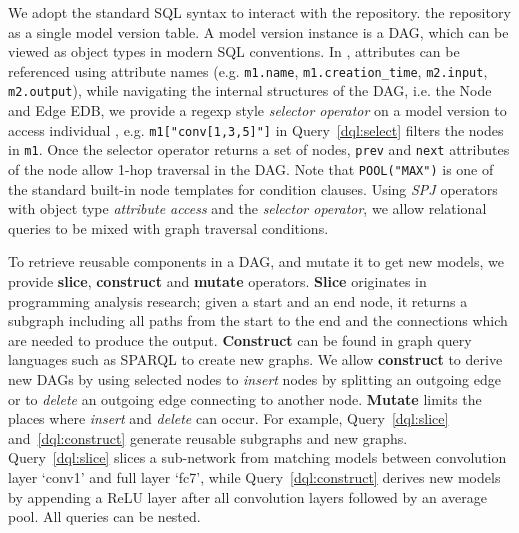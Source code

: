 \documentclass[conference]{IEEEtran}
\begin{document}
We adopt the standard SQL syntax to interact with the repository. \DQL\views
the repository as a single model version table. A model
version instance is a DAG, which can be viewed as object types in modern SQL conventions. In \DQL,
         attributes can be referenced using attribute names (e.g. \verb|m1.name|,
                \verb|m1.creation_time|, \verb|m2.input|, \verb|m2.output|), while navigating the
        internal structures of the DAG, i.e. the Node and Edge EDB, we provide a regexp style
        \emph{selector operator} on a model version to access individual \dnn\nodes{}, e.g. 
        \verb|m1["conv[1,3,5]"]| in Query~\ref{dql:select} filters the nodes in \verb|m1|. %
        Once the selector operator returns a set of nodes, \verb|prev| and \verb|next| attributes of
        the node allow 1-hop traversal in the DAG. Note that \verb|POOL("MAX")| is one of the
        standard built-in node templates for condition clauses. Using \emph{SPJ} operators with
        object type \emph{attribute access} and the \emph{selector operator}, we allow 
        relational queries to be mixed with graph traversal conditions.


To retrieve reusable components in a DAG, and mutate it to get new models, we provide \textbf{slice},
   \textbf{construct} and \textbf{mutate} operators. \textbf{Slice} originates in programming analysis
   research; given a start and an end node, it
    returns a subgraph including all paths from the start to the end and the connections which
    are needed to produce the output. \textbf{Construct} can be found in graph query
    languages such as SPARQL to create new graphs. We allow \textbf{construct} to
    derive new DAGs by using selected nodes to \emph{insert} nodes by splitting an outgoing edge or
    to \emph{delete} an outgoing edge connecting to another node. \textbf{Mutate} limits
    the places where \emph{insert} and \emph{delete} can occur. For example, Query~\ref{dql:slice}
    and~\ref{dql:construct} generate reusable
    subgraphs and new graphs. Query~\ref{dql:slice} slices a sub-network from matching models
    between convolution layer `conv1' and full layer `fc7', while Query~\ref{dql:construct} derives
    new models by appending a ReLU layer after all convolution layers followed by an average pool. All queries can be nested.
\end{document}
